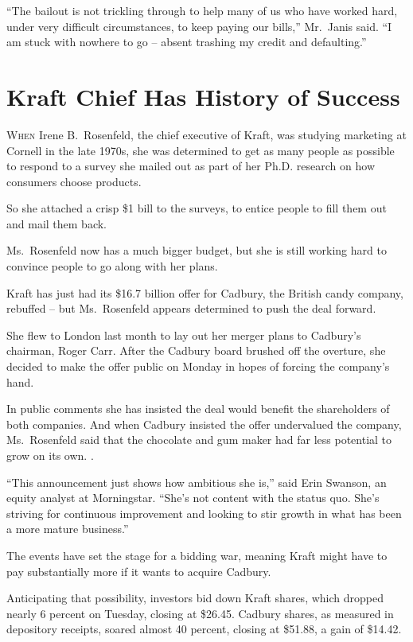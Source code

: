 ﻿\documentclass[12pt]{article}
\begin{document}
``The bailout is not trickling through to help many of us who have worked hard, under very difficult
circumstances, to keep paying our bills,'' Mr.~Janis said. ``I am stuck with nowhere to go -- absent
trashing my credit and defaulting.''

\section{Kraft Chief Has History of Success}

\lettrine{W}{hen} Irene B.~Rosenfeld, the chief executive of Kraft, was studying marketing at
Cornell in the late 1970s, she was determined to get as many people as possible to respond to a
survey she mailed out as part of her Ph.D. research on how consumers choose products.

So she attached a crisp \$1 bill to the surveys, to entice\cite{entice} people to fill them out and
mail them back.

Ms.~Rosenfeld now has a much bigger budget, but she is still working hard to convince people to go
along with her plans.

Kraft has just had its \$16.7 billion offer for Cadbury, the British candy company, rebuffed -- but
Ms.~Rosenfeld appears determined to push the deal forward.

She flew to London last month to lay out her merger plans to Cadbury's chairman, Roger Carr. After
the Cadbury board brushed off the overture, she decided to make the offer public on Monday in hopes
of forcing the company's hand.

In public comments she has insisted the deal would benefit the shareholders of both companies. And
when Cadbury insisted the offer undervalued the company, Ms.~Rosenfeld said that the chocolate and
gum maker had far less potential to grow on its own. .

``This announcement just shows how ambitious she is,'' said Erin Swanson, an equity analyst at
Morningstar. ``She's not content with the status quo. She's striving for continuous improvement and
looking to stir growth in what has been a more mature business.''

The events have set the stage for a bidding war, meaning Kraft might have to pay substantially more
if it wants to acquire Cadbury.

Anticipating that possibility, investors bid down Kraft shares, which dropped nearly 6 percent on
Tuesday, closing at \$26.45. Cadbury shares, as measured in depository receipts, soared almost 40
percent, closing at \$51.88, a gain of \$14.42.
\end{document}
